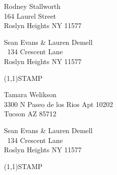 \documentclass[12pt]{article}
\begin{document}
\begin{center} \begin{Huge} \vspace*{\fill}
Rodney Stallworth\\
164 Laurel Street\\
Roslyn Heights NY 11577\\
\vspace{\fill} \end{Huge} \end{center}

\clearpage

\begin{minipage}{.5\linewidth} \noindent
Sean Evans \& Lauren Demell\\\ 
134 Crescent Lane\\ 
Roslyn Heights NY 11577
\end{minipage}
\begin{minipage}{.5\linewidth \hspace{-.2in} \vspace{-.3in}}
\begin{flushright}
\framebox(1,1){STAMP}
\end{flushright}
\end{minipage}

\begin{center} \begin{Huge} \vspace*{\fill}
Tamara Welikson\\
3300 N Paseo de los Rios Apt 10202\\
Tucson AZ 85712\\
\vspace{\fill} \end{Huge} \end{center}

\clearpage

\begin{minipage}{.5\linewidth} \noindent
Sean Evans \& Lauren Demell\\\ 
134 Crescent Lane\\ 
Roslyn Heights NY 11577
\end{minipage}
\begin{minipage}{.5\linewidth \hspace{-.2in} \vspace{-.3in}}
\begin{flushright}
\framebox(1,1){STAMP}
\end{flushright}
\end{minipage}
\end{document}

